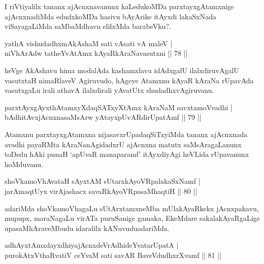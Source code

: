 \begin{artha}
I riVtiyalilx tananx ajAcnxnavanunx kaLedukoMDa parxtayxgAtamxnige ajAcnxnadiMda edudxkoMDa hasivu bAyArike itAyxdi lakaSxNada viSayagaLiMda saMbaMdhavu elilxMda barabeVku?.
\end{artha}


\begin{shl}
yathA vishudadhxmAkAshaM sati vA\s sati vA maleV |\\
niVhArAdw tatheYvA\s \s tAmx kAyaRkAraNavasutxni \hfill || 78 ||
\end{shl}

\begin{artha}
heVge AkAshavu hima modalAda kashamxlavu idAdxgalU ilalxdiruvAgalU vasutxtaH nimaRlaveV Agiruvudo, hAgeye Atamxnu kAyaR kAraNa rUpavAda vasutxgaLu irali athavA ilalxdirali yAvatUtx shudadhxvAgiruvanu.
\end{artha}

\begin{shl}
parxtAyxgAyxthAtamxyXdaqSATxyX\s \s tAmx kAraNaM savxtamoVvadhi |\\
bAdhitAvx\s jAcnxnasaMsArw yAtayxpUvARdirUpatAmf \hfill || 79 ||
\end{shl}

\begin{artha}
Atamxnu parxtayxgAtamxna nijasavxrUpadaqSiTxyiMda tananx ajAcnxnada avadhi payaRMta kAraNanAgidadxrU ajAcnxna matutx saMsAragaLanunx toDedu hAki punaH `apUvaR manaparamf' itAyxdiyAgi heVLida rUpavanunx hoMduvanu.
\end{artha}


\begin{shl}
shoVkamoVhAvataH sAyxtAM sUtarxkAyoVRpalakaSxNamf |\\
jarAmaqtUyx virAjashacx savaRkAyoVRpasaMhaqtiH \hfill || 80 ||
\end{shl}

\begin{artha}
adariMda shoVkamoVhagaLu sUtArxtamxneMba mUlakAyaRkekx jAcnxpakavu, mupupx, maraNagaLu virATa puruSanige gamaka, EkeMdare sakalakAyaRgaLige upasaMhAraveMbudu idaralilx kANuvudu\break	 adariMda.
\end{artha}

\begin{shl}
adhAyxtAmxdayxdhiyajAcnxdeVrAdhideYvatarUpatA |\\
purokAtxV\s thaRvatiV ceYvaM sati savAR BaveVdudhxrXvamf \hfill || 81 ||
\end{shl}

